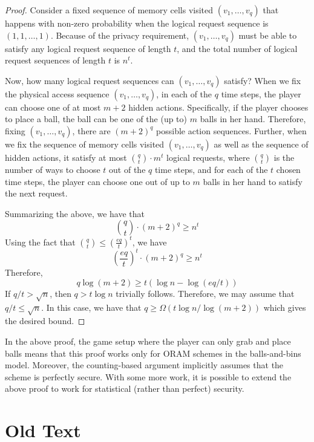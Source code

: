 \begin{proof}
Consider a fixed sequence of memory cells visited 
$(v_1, \ldots, v_q)$ 
that happens with non-zero probability 
when the logical request sequence is $(1, 1, \ldots, 1)$.
Because of the privacy requirement, 
$(v_1, \ldots, v_q)$ 
must be able to satisfy any logical request
sequence of length $t$, and the total number
of logical request sequences of length $t$ is $n^t$.

Now, how many logical request sequences
can $(v_1, \ldots, v_q)$ 
satisfy? 
When we fix %
the physical access sequence 
$(v_1, \ldots, v_q)$, 
in each of the 
$q$ time steps, the player can choose 
one of at most $m+2$ hidden actions. 
Specifically, if the player chooses to place a ball,
the ball can be 
one of the (up to) $m$ balls in her hand. 
Therefore, fixing $(v_1, \ldots, v_q)$, there are 
$(m+2)^q$ possible 
action sequences.
Further, when we fix the sequence of memory cells
visited $(v_1, \ldots, v_q)$
as well as the sequence of hidden actions, 
it 
satisfy at most ${q \choose t} \cdot m^t$
logical requests, where $q \choose t$ is the number
of ways to choose $t$ out of the $q$ time steps,
and for each of the $t$ chosen time steps, the player can choose
one out of up to $m$ balls in her hand to satisfy the next request.

Summarizing the above, we have
that 
\[
{q \choose t} \cdot (m+2)^q \geq n^t
\]
Using the fact that ${q \choose t} \leq \left(\frac{eq}{t}\right)^t$, we have
\[
\left(\frac{eq}{t}\right)^t\cdot (m+2)^q \geq n^t
\]
Therefore,
\[
q \log(m+2) \geq t (\log n  -  \log (eq/t))
\]
If $q/t > \sqrt{n}$, then $q > t \log n$ trivially follows.
Therefore, we may assume that $q/t \leq \sqrt{n}$.  
In this case, 
we have that 
$q \geq \Omega(t\log n/\log(m+2))$ which gives the desired bound. 
\end{proof}

In the above proof, 
the game setup
where the player can only grab and place
balls means that this proof works only 
for ORAM schemes in the balls-and-bins model.
Moreover,  the counting-based argument %
implicitly assumes that the 
scheme is perfectly secure.
With some more work,
it is possible to extend the above proof to 
work for statistical (rather than 
perfect) security. 

\section{Old Text}


